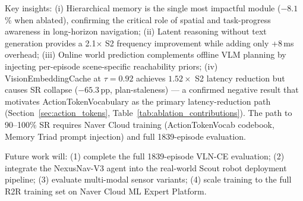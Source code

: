 \documentclass[10pt,twocolumn,letterpaper]{article}
\begin{document}
Key insights: (i) Hierarchical memory is the single most impactful module ($-8.1$\% when ablated), confirming the critical role of spatial and task-progress awareness in long-horizon navigation; (ii) Latent reasoning without text generation provides a 2.1$\times$ S2 frequency improvement while adding only +8\,ms overhead; (iii) Online world prediction complements offline VLM planning by injecting per-episode scene-specific reachability priors; (iv) VisionEmbeddingCache at $\tau=0.92$ achieves $1.52\times$ S2 latency reduction but causes SR collapse ($-65.3$\,pp, plan-staleness) — a confirmed negative result that motivates ActionTokenVocabulary as the primary latency-reduction path (Section~\ref{sec:action_tokens}, Table~\ref{tab:ablation_contributions}). The path to 90--100\% SR requires Naver Cloud training (ActionTokenVocab codebook, Memory Triad prompt injection) and full 1839-episode evaluation.

Future work will: (1) complete the full 1839-episode VLN-CE evaluation; (2) integrate the NexusNav-V3 agent into the real-world Scout robot deployment pipeline; (3) evaluate multi-modal sensor variants; (4) scale training to the full R2R training set on Naver Cloud ML Expert Platform.


{\small


}
\end{document}
